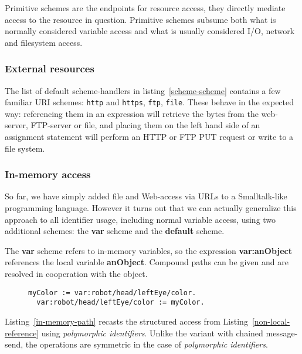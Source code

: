 \documentclass[preprint,authoryear]{acm_proc_article-sp}
\begin{document}
Primitive schemes are the endpoints for resource access, they directly
mediate access to the resource in question.  Primitive schemes
subsume both what is normally considered variable access and 
what is usually considered I/O, network and filesystem access.



\subsubsection{External resources}
\label{externalResources}

The list of default scheme-handlers in listing~\ref{scheme-scheme} contains a few familiar URI schemes:
{\tt http} and {\tt https}, {\tt ftp}, {\tt file}.   These behave in the expected way:   referencing them in an expression will
retrieve the bytes from the web-server, FTP-server or file, and placing them on the left hand side of
an assignment statement will perform an HTTP or FTP PUT request or write to a file system.



\subsubsection{In-memory access}
\label{inmemory}

So far, we have simply added file and Web-access via URLs to a 
Smalltalk-like programming language.  However it turns out that we can actually generalize
this approach to all identifier usage, including normal variable access, using
two additional schemes:  the {\bf var} scheme and the {\bf default} scheme.

The {\bf var} scheme refers to in-memory variables, so the expression
 {\bf var:anObject} references the
local variable {\bf anObject}.   Compound paths can be given and are resolved in
cooperation with the object.


\begin{figure}[htbp]
\begin{lstlisting}[style=L,label=in-memory-path,caption=In-memory access path.]
  myColor := var:robot/head/leftEye/color.
  var:robot/head/leftEye/color := myColor.
\end{lstlisting}
\end{figure}

Listing~\ref{in-memory-path} recasts the structured access from 
Listing~\ref{non-local-reference} using \emph{polymorphic identifiers}.  Unlike the variant
with chained message-send, the operations are symmetric in the case of \emph{polymorphic identifiers}.
\end{document}
